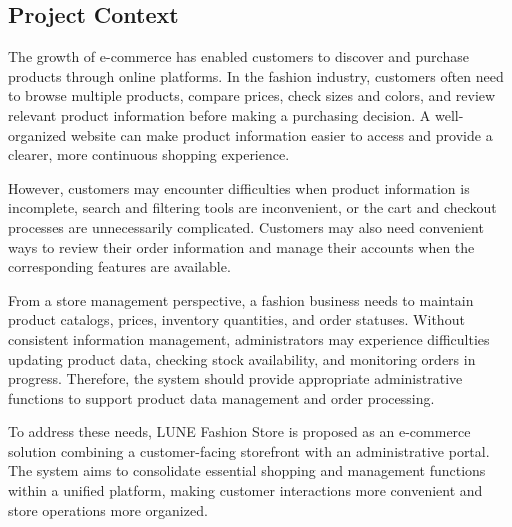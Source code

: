 \documentclass[12pt,a4paper,oneside]{report}
\begin{document}
\subsection{Project Context}
The growth of e-commerce has enabled customers to discover and purchase products through online platforms. In the fashion industry, customers often need to browse multiple products, compare prices, check sizes and colors, and review relevant product information before making a purchasing decision. A well-organized website can make product information easier to access and provide a clearer, more continuous shopping experience.

However, customers may encounter difficulties when product information is incomplete, search and filtering tools are inconvenient, or the cart and checkout processes are unnecessarily complicated. Customers may also need convenient ways to review their order information and manage their accounts when the corresponding features are available.

From a store management perspective, a fashion business needs to maintain product catalogs, prices, inventory quantities, and order statuses. Without consistent information management, administrators may experience difficulties updating product data, checking stock availability, and monitoring orders in progress. Therefore, the system should provide appropriate administrative functions to support product data management and order processing.

To address these needs, LUNE Fashion Store is proposed as an e-commerce solution combining a customer-facing storefront with an administrative portal. The system aims to consolidate essential shopping and management functions within a unified platform, making customer interactions more convenient and store operations more organized.
\end{document}

